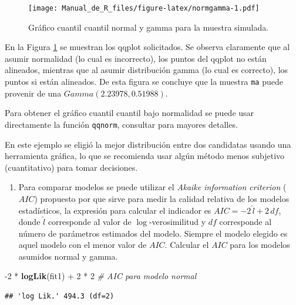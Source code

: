 \documentclass[10pt,]{krantz}
\makeatletter
\newenvironment{Shaded}{\begin{snugshade}}{\end{snugshade}}
\newcommand{\KeywordTok}[1]{\textcolor[rgb]{0.13,0.29,0.53}{\textbf{{#1}}}}
\newcommand{\DecValTok}[1]{\textcolor[rgb]{0.00,0.00,0.81}{{#1}}}
\newcommand{\StringTok}[1]{\textcolor[rgb]{0.31,0.60,0.02}{{#1}}}
\newcommand{\CommentTok}[1]{\textcolor[rgb]{0.56,0.35,0.01}{\textit{{#1}}}}
\newcommand{\NormalTok}[1]{{#1}}
\providecommand{\tightlist}{%
  \setlength{\itemsep}{0pt}\setlength{\parskip}{0pt}}
\newenvironment{kframe}{%
\medskip{}
\setlength{\fboxsep}{.8em}
 \def\at@end@of@kframe{}%
 \ifinner\ifhmode%
  \def\at@end@of@kframe{\end{minipage}}%
  \begin{minipage}{\columnwidth}%
 \fi\fi%
 \def\FrameCommand##1{\hskip\@totalleftmargin \hskip-\fboxsep
 \colorbox{shadecolor}{##1}\hskip-\fboxsep
     \hskip-\linewidth \hskip-\@totalleftmargin \hskip\columnwidth}%
 \MakeFramed {\advance\hsize-\width
   \@totalleftmargin\z@ \linewidth\hsize
   \@setminipage}}%
 {\par\unskip\endMakeFramed%
 \at@end@of@kframe}
\renewenvironment{Shaded}{\begin{kframe}}{\end{kframe}}
\let\BeginKnitrBlock\begin \let\EndKnitrBlock\end
\makeatother
\begin{document}
\begin{figure}[htbp]
\centering
\texttt{[image: Manual\_de\_R\_files/figure-latex/normgamma-1.pdf]}
\caption{\label{fig:normgamma}Gráfico cuantil cuantil normal y gamma para la
muestra simulada.}
\end{figure}

En la Figura \ref{fig:normgamma} se muestran los qqplot solicitados. Se
observa claramente que al asumir normalidad (lo cual es incorrecto), los
puntos del qqplot no están alineados, mientras que al asumir
distribución gamma (lo cual es correcto), los puntos si están alineados.
De esta figura se concluye que la muestra \texttt{ma} puede provenir de
una \(Gamma(2.23978, 0.51988)\).

\BeginKnitrBlock{rmdtip}
Para obtener el gráfico cuantil cuantil bajo normalidad se puede usar
directamente la función \texttt{qqnorm}, consultar
\citet{hernandez_correa} para mayores detalles.
\EndKnitrBlock{rmdtip}

\BeginKnitrBlock{rmdwarning}
En este ejemplo se eligió la mejor distribución entre dos candidatas
usando una herramienta gráfica, lo que se recomienda usar algún método
menos subjetivo (cuantitativo) para tomar decisiones.
\EndKnitrBlock{rmdwarning}

\begin{enumerate}
\def\labelenumi{\arabic{enumi})}
\setcounter{enumi}{3}
\tightlist
\item
  Para comparar modelos se puede utilizar el \emph{Akaike information
  criterion} (\(AIC\)) propuesto por \citet{Akaike74} que sirve para
  medir la calidad relativa de los modelos estadísticos, la expresión
  para calcular el indicador es \(AIC=-2 \, \hat{l}+2 \, df\), donde
  \(\hat{l}\) corresponde al valor de \(\log\)-verosimilitud y \(df\)
  corresponde al número de parámetros estimados del modelo. Siempre el
  modelo elegido es aquel modelo con el menor valor de \(AIC\). Calcular
  el \(AIC\) para los modelos asumidos normal y gamma.
\end{enumerate}

\begin{Shaded}
\begin{Highlighting}[]
\NormalTok{-}\DecValTok{2} \NormalTok{*}\StringTok{ }\KeywordTok{logLik}\NormalTok{(fit1) +}\StringTok{ }\DecValTok{2} \NormalTok{*}\StringTok{ }\DecValTok{2}  \CommentTok{# AIC para modelo normal}
\end{Highlighting}
\end{Shaded}

\begin{verbatim}
## 'log Lik.' 494.3 (df=2)
\end{verbatim}
\end{document}

